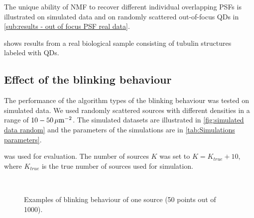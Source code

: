 The unique ability of NMF to recover different individual overlapping PSFs is illustrated on simulated data and on randomly scattered out-of-focus QDs in \autoref{sub:results - out of focus PSF real data}.

 shows results from a real biological sample consisting of tubulin structures labeled with QDs.


\subsection{Effect of the blinking behaviour \label{sub:results - blinking behaviour}}
The performance of the algorithm types of the blinking behaviour was tested on simulated data. We used randomly scattered sources with different densities in a range of $10-50\, \mathrm{\mu m}^{-2}$. The simulated datasets are illustrated in \autoref{fig:simulated data random} and the parameters of the simulations are in \autoref{tab:Simulations parameters}. 

 was used for evaluation. The number of sources $K$ was set to $K=K_{true}+10$, where $K_{true}$ is the true number of sources used for simulation. 

\begin{figure}[!h]
	\centering
	\newcommand{\sizef}{.35}
	\\
	\subfloat[telegraph oversampled ($\tilde{\gamma}=0.05$)]{
	\texttt{[image: \\qd S455/images/blinkmatS565]}} %
	\caption{Examples of blinking behaviour of one source (50 points out of 1000).}
	\label{fig:blinking}
\end{figure}


